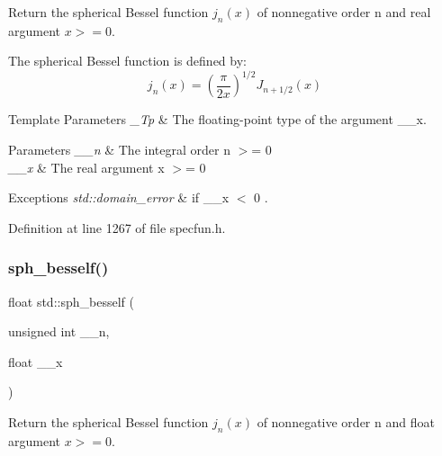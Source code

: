 Return the spherical Bessel function $ j_n(x) $ of nonnegative order n and real argument $ x >= 0 $.

The spherical Bessel function is defined by\+: \[ j_n(x) = \left(\frac{\pi}{2x} \right) ^{1/2} J_{n+1/2}(x) \]


\begin{DoxyTemplParams}{Template Parameters}
{\em \+\_\+\+Tp} & The floating-\/point type of the argument {\ttfamily \+\_\+\+\_\+x}. \\
\hline
\end{DoxyTemplParams}

\begin{DoxyParams}{Parameters}
{\em \+\_\+\+\_\+n} & The integral order {\ttfamily  n $>$= 0 } \\
\hline
{\em \+\_\+\+\_\+x} & The real argument {\ttfamily  x $>$= 0 } \\
\hline
\end{DoxyParams}

\begin{DoxyExceptions}{Exceptions}
{\em std\+::domain\+\_\+error} & if {\ttfamily  \+\_\+\+\_\+x $<$ 0 }. \\
\hline
\end{DoxyExceptions}


Definition at line 1267 of file specfun.\+h.

\mbox{\label{group__tr29124__math__spec__func_ga534e36e1dcefad8daec98920db16eec4}} 
\subsubsection{\texorpdfstring{sph\+\_\+besself()}{sph\_besself()}}
{\footnotesize\ttfamily float std\+::sph\+\_\+besself (\begin{DoxyParamCaption}\item[{unsigned int}]{\+\_\+\+\_\+n,  }\item[{float}]{\+\_\+\+\_\+x }\end{DoxyParamCaption})\hspace{0.3cm}{\ttfamily [inline]}}

Return the spherical Bessel function $ j_n(x) $ of nonnegative order n and {\ttfamily float} argument $ x >= 0 $.

